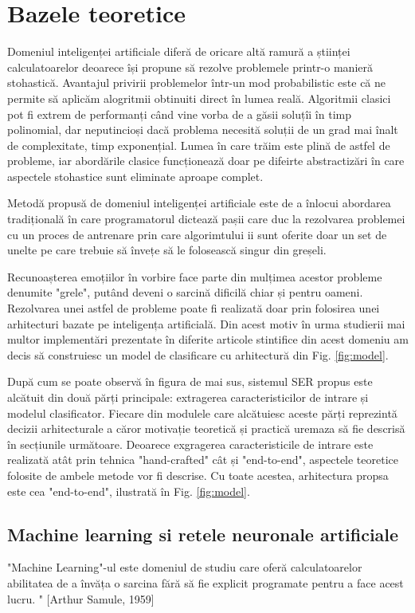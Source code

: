 \documentclass[a4paper,12pt]{book}
\begin{document}
			\chapter{Bazele teoretice}				 
				 Domeniul inteligenței artificiale diferă de oricare altă ramură a științei calculatoarelor deoarece își propune să rezolve problemele printr-o manieră stohastică. Avantajul privirii problemelor într-un mod probabilistic este că ne permite să aplicăm alogritmii obtinuiti direct în lumea reală. Algoritmii clasici pot fi extrem de performanți când vine vorba de a găsii soluțîi în timp polinomial, dar neputincioși dacă problema necesită soluții de un grad mai înalt de complexitate, timp exponențial. Lumea în care trăim este plină de astfel de probleme, iar abordările clasice funcționează doar pe difeirte abstractizări în care aspectele stohastice sunt eliminate aproape complet. \par				 
				 Metodă propusă de domeniul inteligenței artificiale este de a înlocui abordarea tradițională în care programatorul dictează pașii care duc la rezolvarea problemei cu un proces de antrenare prin care algorimtului ii sunt oferite doar un set de unelte pe care trebuie să învețe să le folosească singur din greșeli. \par			 
				 Recunoașterea emoțiilor în vorbire face parte din mulțimea acestor probleme denumite "grele", putând deveni o sarcină dificilă chiar și pentru oameni. Rezolvarea unei astfel de probleme poate fi realizată doar prin folosirea unei arhitecturi bazate pe inteligența artificială. Din acest motiv în urma studierii mai multor implementări prezentate în diferite articole stintifice din acest domeniu am decis să construiesc un model de clasificare cu arhitectură din Fig. \ref{fig:model}. \par
				 După cum se poate observă în figura de mai sus, sistemul SER propus este alcătuit din două părți principale: extragerea caracteristicilor de intrare și modelul clasificator. Fiecare din modulele care alcătuiesc aceste părți reprezintă decizii arhitecturale a căror motivație teoretică și practică uremaza să fie descrisă în secțiunile următoare. Deoarece exgragerea caracteristicile de intrare este realizată atât prin tehnica "hand-crafted" cât și "end-to-end", aspectele teoretice folosite de ambele metode vor fi descrise. Cu toate acestea, arhitectura propsa este cea "end-to-end", ilustrată în Fig. \ref{fig:model}.
			\section{Machine learning si retele neuronale artificiale} \label{ml}
			"Machine Learning"-ul este domeniul de studiu care oferă calculatoarelor abilitatea de a învăța o sarcina fără să fie explicit programate pentru a face acest lucru. " [Arthur Samule, 1959]  \par
			
\end{document}
